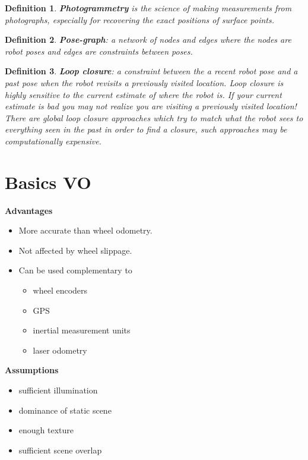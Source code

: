 \documentclass[10pt,a4paper]{scrartcl}
\newtheorem{define}{Definition}
\begin{document}
\begin{multicols*}{2}
\begin{define}
\textbf{Photogrammetry} is the science of making measurements from photographs, especially for recovering the exact positions of surface points.
\end{define}

\begin{define}
\textbf{Pose-graph}: a network of nodes and edges where the nodes are robot poses and edges are constraints between poses.
\end{define}

\begin{define}
\textbf{Loop closure}: a constraint between the a recent robot pose and a past pose when the robot revisits a previously visited location. Loop closure is highly sensitive to the current estimate of where the robot is. If your current estimate is bad you may not realize you are visiting a previously visited location! There are global loop closure approaches which try to match what the robot sees to everything seen in the past in order to find a closure, such approaches may be computationally expensive.
\end{define}

\section{Basics VO}

\textbf{Advantages}
\begin{itemize}
\item More accurate than wheel odometry.
\item Not affected by wheel slippage.
\item Can be used complementary to
\begin{itemize}
\item wheel encoders
\item GPS
\item inertial measurement units
\item laser odometry
\end{itemize}
\end{itemize}

\textbf{Assumptions}
\begin{itemize}
\item sufficient illumination
\item dominance of static scene
\item enough texture
\item sufficient scene overlap
\end{itemize}


\end{multicols*}
\end{document}

